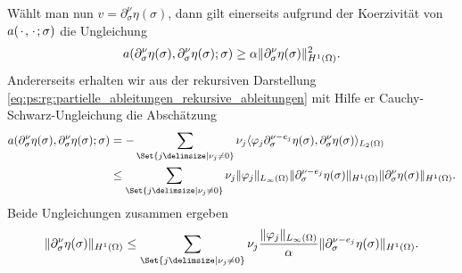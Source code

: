 \begin{Satz}
\begin{Beweis}
        Wählt man nun $v = \partial^{\nu}_{\sigma} \eta(\sigma)$, dann gilt einerseits aufgrund der Koerzivität von $a({\mkern2mu\cdot\mkern2mu}, {\mkern2mu\cdot\mkern2mu}; \sigma)$ die Ungleichung
        \begin{equation}
            a(\partial^{\nu}_{\sigma} \eta(\sigma), \partial^{\nu}_{\sigma} \eta(\sigma); \sigma) \geq \alpha \lVert\partial^{\nu}_{\sigma} \eta(\sigma)\rVert_{H^{1}(\Omega)}^{2}.
        \end{equation}
        Andererseits erhalten wir aus der rekursiven Darstellung \cref{eq:ps:rg:partielle_ableitungen_rekursive_ableitungen} mit Hilfe er Cauchy-Schwarz-Ungleichung die Abschätzung
        \begin{align}
            a(\partial^{\nu}_{\sigma} \eta(\sigma), \partial^{\nu}_{\sigma} \eta(\sigma); \sigma)
            &= - \sum_{\Set{j \given \nu_{j} \neq 0}} \nu_{j} \skp{\varphi_{j} \partial^{\nu - e_{j}}_{\sigma} \eta(\sigma) }{\partial^{\nu}_{\sigma} \eta(\sigma)}{L_{2}(\Omega)}
            \\&\leq \sum_{\Set{j \given \nu_{j} \neq 0}} \nu_{j} \norm{\varphi_{j}}_{L_{\infty}(\Omega)} \norm{\partial^{\nu - e_{j}}_{\sigma} \eta(\sigma)}_{H^{1}(\Omega)} \norm{\partial^{\nu}_{\sigma} \eta(\sigma)}_{H^{1}(\Omega)}.
        \end{align}
        Beide Ungleichungen zusammen ergeben
        \begin{equation}
        \label{eq:ps:rg:partielle_ableitungen_schranke_rekursiv}
            \norm{\partial^{\nu}_{\sigma} \eta(\sigma)}_{H^{1}(\Omega)} \leq \sum_{\Set{j \given \nu_{j} \neq 0}} \nu_{j} \frac{\norm{\varphi_{j}}_{L_{\infty}(\Omega)}}{\alpha} \norm{\partial^{\nu - e_{j}}_{\sigma} \eta(\sigma)}_{H^{1}(\Omega)}.
        \end{equation}


\end{Beweis}
\end{Satz}
